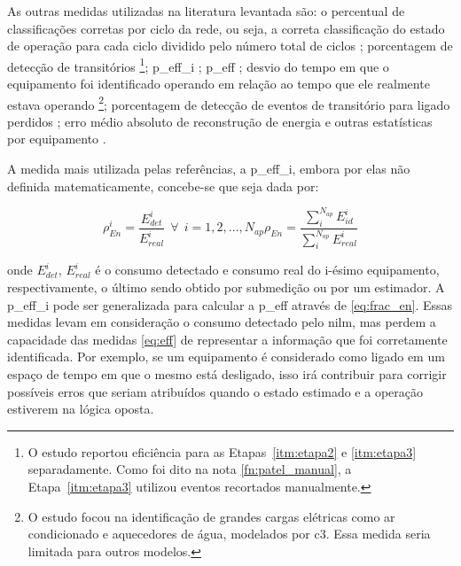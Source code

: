 As outras medidas utilizadas na literatura levantada são: o
percentual de classificações corretas por ciclo da rede, ou seja, a
correta classificação do estado de operação para cada ciclo dividido
pelo número total de ciclos
\cite{nilm_srinivasan_nn_2006_27,nilm_suzuki_2011_35}; porcentagem de
detecção de transitórios \cite{nilm_patel_2007_29}\footnote{O estudo
reportou eficiência para as Etapas~\ref{itm:etapa2} e \ref{itm:etapa3}
separadamente. Como foi dito na nota \ref{fn:patel_manual}, a
Etapa~\ref{itm:etapa3} utilizou eventos recortados manualmente.};
\gls{p_eff_i}
\cite{nilm_hart_1992_8,nilm_cole_data_extraction_1998_14,
nilm_cole_extra_info_surge_1998_15,nilm_farinaccio_16ssamp_1999_17,
nilm_marceau_16ssamp_improved_1999_18}; \gls{p_eff} 
\cite{2010_nilm_melhorando_pph_usa_37}; desvio
do tempo em que o equipamento foi identificado operando em relação ao
tempo que ele realmente estava operando
\cite{nilm_farinaccio_16ssamp_1999_17}\footnote{O estudo focou na
identificação de grandes cargas elétricas como ar condicionado e
aquecedores de água, modelados por \gls{c3}\label{fn:valc3}. Essa
medida seria limitada para outros modelos.}; porcentagem de detecção
de eventos de transitório para ligado perdidos
\cite{nilm_farinaccio_16ssamp_1999_17}; erro médio
absoluto de reconstrução de energia e outras estatísticas por equipamento
\cite{nilm_powers_15minsamp_1991_16}.

A medida mais utilizada pelas referências, a \gls{p_eff_i}, embora
por elas não definida matematicamente, concebe-se que seja dada por:

\begin{subequations}
\begin{equation}\label{eq:frac_en_app}
\rho_{En}^i = \frac{E_{det}^i}{E_{real}^i} ~~ \forall ~~ 
i = 1,2,...,N_{ap}
\end{equation}
\begin{equation}\label{eq:frac_en}
\rho_{En} = \frac{\sum_{i}^{N_{ap}}E_{id}^i}{\sum_{i}^{N_{ap}}E_{real}^i} 
\end{equation}
\end{subequations}

\noindent onde $E_{det}^i$, $E_{real}^i$ é o consumo detectado e
consumo real do i-ésimo equipamento, respectivamente, o último sendo
obtido por submedição ou por um estimador. A \gls{p_eff_i}
pode ser generalizada para calcular a \gls{p_eff} através de
\ref{eq:frac_en}.  Essas medidas levam em consideração o consumo
detectado pelo \gls{nilm}, mas perdem a capacidade das medidas 
\ref{eq:eff} de representar a informação que foi corretamente
identificada. Por exemplo, se um equipamento é considerado como ligado
em um espaço de tempo em que o mesmo está desligado, isso irá
contribuir para corrigir possíveis erros que seriam atribuídos quando
o estado estimado e a operação estiverem na lógica oposta.

